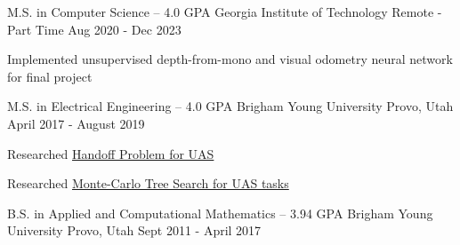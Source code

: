 

\begin{cventries}
  \cventry
    {M.S. in Computer Science -- 4.0 GPA} %
    {Georgia Institute of Technology} %
    {Remote - Part Time} %
    {Aug 2020 - Dec 2023} %
    {
        \begin{cvitems}
            \item{Implemented unsupervised depth-from-mono and visual odometry neural network for final project}
        \end{cvitems}
    }

  \cventry
    {M.S. in Electrical Engineering -- 4.0 GPA} %
    {Brigham Young University} %
    {Provo, Utah} %
    {April 2017 - August 2019} %
    {
        \begin{cvitems}
            \item{Researched \href{https://www.techrxiv.org/doi/full/10.36227/techrxiv.14869476.v1}{\color{awesome-skyblue}Handoff Problem for UAS}}
            \item{Researched \href{https://link.springer.com/article/10.1007/s42452-021-04583-8}{\color{awesome-skyblue}Monte-Carlo Tree Search for UAS tasks}}
        \end{cvitems}
    }

  \cventry
    {B.S. in Applied and Computational Mathematics -- 3.94 GPA} %
    {Brigham Young University} %
    {Provo, Utah} %
    {Sept 2011 - April 2017} %
    {
    }

\end{cventries}
